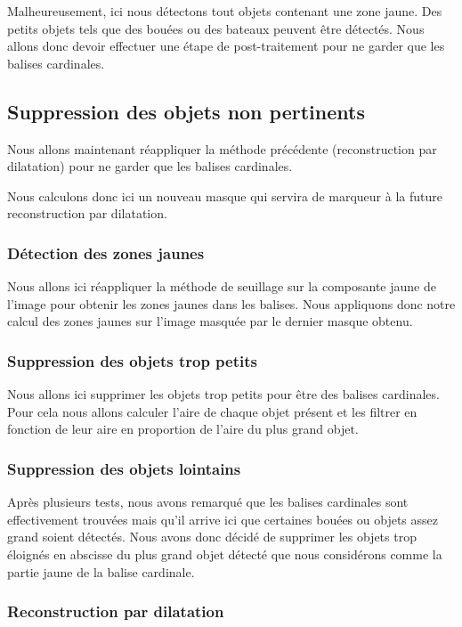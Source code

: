\documentclass{article}
\begin{document}
Malheureusement, ici nous détectons tout objets contenant une zone jaune. Des
petits objets tels que des bouées ou des bateaux peuvent être détectés. Nous
allons donc devoir effectuer une étape de post-traitement pour ne garder que
les balises cardinales.

\subsection{Suppression des objets non pertinents}

Nous allons maintenant réappliquer la méthode précédente (reconstruction par
dilatation) pour ne garder que les balises cardinales.

Nous calculons donc ici un nouveau masque qui servira de marqueur à la future
reconstruction par dilatation.

\subsubsection{Détection des zones jaunes}
Nous allons ici réappliquer la méthode de seuillage sur la composante jaune de
l'image pour obtenir les zones jaunes dans les balises. Nous appliquons donc
notre calcul des zones jaunes sur l'image masquée par le dernier masque obtenu.

\subsubsection{Suppression des objets trop petits}
Nous allons ici supprimer les objets trop petits pour être des balises
cardinales. Pour cela nous allons calculer l'aire de chaque objet présent et
les filtrer en fonction de leur aire en proportion de l'aire du plus grand
objet.

\subsubsection{Suppression des objets lointains}
Après plusieurs tests, nous avons remarqué que les balises cardinales sont
effectivement trouvées mais qu'il arrive ici que certaines bouées ou objets
assez grand soient détectés. Nous avons donc décidé de supprimer les objets
trop éloignés en abscisse du plus grand objet détecté que nous considérons
comme la partie jaune de la balise cardinale.

\subsubsection{Reconstruction par dilatation}
\end{document}
